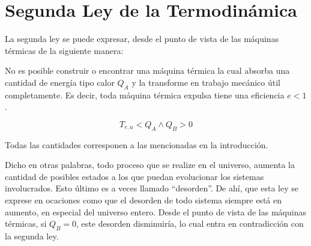 \section{Segunda Ley de la Termodinámica}

La segunda ley se puede expresar, desde el punto de vista de las
máquinas térmicas de la siguiente manera:

No es posible construir o encontrar una máquina térmica la cual absorba
una cantidad de energía tipo calor $Q_A$ y la transforme en trabajo
mecánico útil completamente. Es decir, toda máquina térmica expulsa
tiene una eficiencia $e < 1$.

\[T_{r,u} < Q_A \land Q_B > 0\]

Todas las cantidades corresponen a las mencionadas en la introducción.

Dicho en otras palabras, todo proceso que se realize en el universo,
aumenta la cantidad de posibles estados a los que puedan evolucionar los
sistemas involucrados. Esto último es a veces llamado ``desorden''. De
ahí, que esta ley se exprese en ocaciones como que el desorden de todo
sistema siempre está en aumento, en especial del universo entero.
Desde el punto de vista de las máquinas térmicas, si $Q_B = 0$, este
desorden disminuiría, lo cual entra en contradicción con la segunda ley.